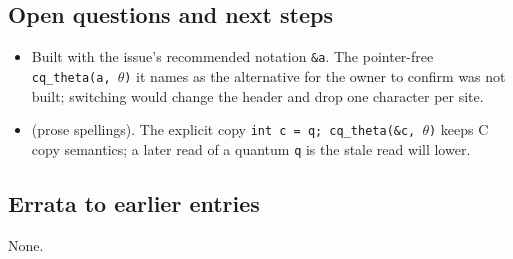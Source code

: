 \subsection*{Open questions and next steps}
\begin{itemize}
  \item Built with the issue's recommended notation \texttt{\&a}. The pointer-free
  \texttt{cq\_theta(a, $\theta$)} it names as the alternative for the owner to confirm
  was not built; switching would change the header and drop one character per site.
  \item {} (prose spellings). The explicit copy
  \texttt{int c = q; cq\_theta(\&c, $\theta$)} keeps C copy semantics; a later read of a
  quantum \texttt{q} is the stale read  will lower.
\end{itemize}

\subsection*{Errata to earlier entries}
None.
